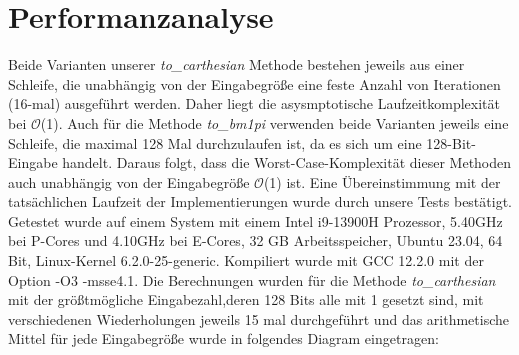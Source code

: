 \documentclass[course=erap]{aspdoc}
\begin{document}
\section{Performanzanalyse}
Beide Varianten unserer \textit{to\_carthesian} Methode bestehen jeweils aus einer Schleife, die unabhängig von der Eingabegröße eine feste Anzahl von Iterationen (16-mal) ausgeführt werden. Daher liegt die asysmptotische Laufzeitkomplexität bei \( \mathcal{O} \)(1). Auch für die Methode \textit{to\_bm1pi } verwenden beide Varianten jeweils eine Schleife, die maximal 128 Mal durchzulaufen ist, da es sich um eine 128-Bit-Eingabe handelt. Daraus folgt, dass die Worst-Case-Komplexität dieser Methoden auch unabhängig von der Eingabegröße \( \mathcal{O} \)(1) ist.
Eine Übereinstimmung mit der tatsächlichen Laufzeit der Implementierungen wurde durch unsere Tests bestätigt.
\vspace{10pt} \newline
Getestet wurde auf einem System mit einem Intel i9-13900H Prozessor, 5.40GHz bei P-Cores und 4.10GHz bei E-Cores, 32 GB Arbeitsspeicher, Ubuntu 23.04, 64 Bit, Linux-Kernel 6.2.0-25-generic. Kompiliert wurde mit GCC 12.2.0 mit der Option -O3 -msse4.1.
Die Berechnungen wurden für die Methode \textit{to\_carthesian} mit der größtmögliche Eingabezahl,deren 128 Bits alle mit 1 gesetzt sind, mit verschiedenen Wiederholungen jeweils 15 mal durchgeführt und das arithmetische Mittel für jede Eingabegröße wurde in folgendes Diagram eingetragen:
\vspace{10pt}

\begin{center}
\end{center}
\end{document}
